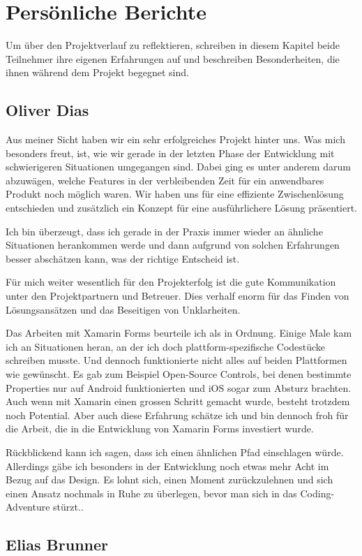 \section{Persönliche Berichte}
Um über den Projektverlauf zu reflektieren, schreiben in diesem Kapitel beide Teilnehmer ihre eigenen Erfahrungen auf und beschreiben Besonderheiten, die ihnen während dem Projekt begegnet sind. 

\subsection{Oliver Dias}
Aus meiner Sicht haben wir ein sehr erfolgreiches Projekt hinter uns. Was mich besonders freut, ist, wie wir gerade in der letzten Phase der Entwicklung mit schwierigeren Situationen umgegangen sind. Dabei ging es unter anderem darum abzuwägen, welche Features in der verbleibenden Zeit für ein anwendbares Produkt noch möglich waren. Wir haben uns für eine effiziente Zwischenlösung entschieden und zusätzlich ein Konzept für eine ausführlichere Lösung präsentiert. 

Ich bin überzeugt, dass ich gerade in der Praxis immer wieder an ähnliche Situationen herankommen werde und dann aufgrund von solchen Erfahrungen besser abschätzen kann, was der richtige Entscheid ist. 

Für mich weiter wesentlich für den Projekterfolg ist die gute Kommunikation unter den Projektpartnern und Betreuer. Dies verhalf enorm für das Finden von Lösungsansätzen und das Beseitigen von Unklarheiten.

Das Arbeiten mit Xamarin Forms beurteile ich als in Ordnung. Einige Male kam ich an Situationen heran, an der ich doch plattform-spezifische Codestücke schreiben musste. Und dennoch funktionierte nicht alles auf beiden Plattformen wie gewünscht. Es gab zum Beispiel Open-Source Controls, bei denen bestimmte Properties nur auf Android funktionierten und iOS sogar zum Absturz brachten. Auch wenn mit Xamarin einen grossen Schritt gemacht wurde, besteht trotzdem noch Potential. Aber auch diese Erfahrung schätze ich und bin dennoch froh für die Arbeit, die in die Entwicklung von Xamarin Forms investiert wurde. 

Rückblickend kann ich sagen, dass ich einen ähnlichen Pfad einschlagen würde. Allerdings gäbe ich besonders in der Entwicklung noch etwas mehr Acht im Bezug auf das Design. Es lohnt sich, einen Moment zurückzulehnen und sich einen Ansatz nochmals in Ruhe zu überlegen, bevor man sich in das Coding-Adventure stürzt..

\subsection{Elias Brunner}
